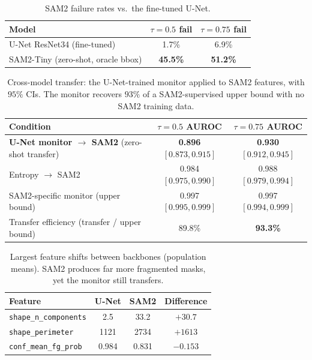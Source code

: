 \documentclass[letterpaper, 10 pt, conference]{ieeeconf}  %
\newcommand{\unet}{U-Net}
\begin{document}
\begin{table}[t]
\caption{SAM2 failure rates vs.\ the fine-tuned \unet{}.}
\label{tab:sam2fail}
\centering
\footnotesize
\setlength{\tabcolsep}{5pt}
\begin{tabular}{lcc}
\toprule
Model & $\tau{=}0.5$ fail & $\tau{=}0.75$ fail \\
\midrule
\unet{} ResNet34 (fine-tuned)        & 1.7\%  & 6.9\% \\
SAM2-Tiny (zero-shot, oracle bbox)   & \textbf{45.5\%} & \textbf{51.2\%} \\
\bottomrule
\end{tabular}
\end{table}

\begin{table}[t]
\caption{Cross-model transfer: the \unet{}-trained monitor applied to SAM2 features, with $95\%$ CIs. The monitor recovers $93\%$ of a SAM2-supervised upper bound with no SAM2 training data.}
\label{tab:transfer}
\centering
\small
\begin{tabular}{lcc}
\toprule
Condition & $\tau=0.5$ AUROC & $\tau=0.75$ AUROC \\
\midrule
\textbf{\unet{} monitor $\rightarrow$ SAM2} (zero-shot transfer) & \textbf{0.896} $[0.873, 0.915]$ & \textbf{0.930} $[0.912, 0.945]$ \\
Entropy $\rightarrow$ SAM2                                       & 0.984 $[0.975, 0.990]$ & 0.988 $[0.979, 0.994]$ \\
SAM2-specific monitor (upper bound)                             & 0.997 $[0.995, 0.999]$ & 0.997 $[0.994, 0.999]$ \\
Transfer efficiency (transfer / upper bound)                    & 89.8\% & \textbf{93.3\%} \\
\bottomrule
\end{tabular}
\end{table}

\begin{table}[t]
\caption{Largest feature shifts between backbones (population means). SAM2 produces far more fragmented masks, yet the monitor still transfers.}
\label{tab:featshift}
\centering
\small
\begin{tabular}{lccc}
\toprule
Feature & \unet{} & SAM2 & Difference \\
\midrule
\texttt{shape\_n\_components} & 2.5  & 33.2 & $+30.7$ \\
\texttt{shape\_perimeter}     & 1121 & 2734 & $+1613$ \\
\texttt{conf\_mean\_fg\_prob} & 0.984 & 0.831 & $-0.153$ \\
\bottomrule
\end{tabular}
\end{table}
\end{document}
